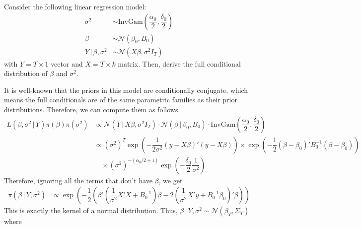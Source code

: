 \documentclass[answers]{exam}
\begin{document}
\newpage
{}
\begin{questions}
  \question
  Consider the following linear regression model:
  \begin{align}
    \sigma^{2} &\sim \mathrm{InvGam}\left(\dfrac{\alpha_{0}}{2},\dfrac{\delta_{0}}{2}\right)\\
    \beta &\sim \mathcal{N}\left(\beta_{0},B_{0}\right)\\
    Y\,|\,\beta,\sigma^{2} &\sim \mathcal{N}\left(X\beta,\sigma^{2}I_{T}\right)
  \end{align}
  with $Y=T\times 1$ vector and $X=T\times k$ matrix. Then, derive the full conditional distribution of $\beta$ and $\sigma^{2}$.
  \begin{solution}
    It is well-known that the priors in this model are conditionally conjugate, which means the full conditionals are of the same parametric families as their prior distributions. Therefore, we can compute them as follows.
    \begin{align}
      L(\beta,\sigma^{2}\,|\,Y)\pi\left(\beta\right)\pi\left(\sigma^{2}\right) &\propto \mathcal{N}\left(Y\,|\,X\beta,\sigma^{2}I_{T}\right)\cdot \mathcal{N}\left(\beta\,|\,\beta_{0},B_{0}\right)\cdot \mathrm{InvGam}\left(\dfrac{\alpha_{0}}{2},\dfrac{\delta_{0}}{2}\right)\\
      &\propto \left(\sigma^{2}\right)^{T}\exp\left(-\dfrac{1}{2\sigma^{2}}\left(y-X\beta\right)'\left(y-X\beta\right)\right)\times \exp\left(-\dfrac{1}{2}\left(\beta-\beta_{0}\right)'B_{0}^{-1}\left(\beta-\beta_{0}\right)\right)\\
      &\quad \times \left(\sigma^{2}\right)^{-\left(\alpha_{0}/2+1\right)}\exp\left(-\dfrac{\delta_{0}}{2}\dfrac{1}{\sigma^{2}}\right)
    \end{align}
    Therefore, ignoring all the terms that don't have $\beta$, we get
    \begin{align}
      \pi\left(\beta\,|\,Y,\sigma^{2}\right) &\propto \exp\left(-\dfrac{1}{2}\left(\beta'\left(\dfrac{1}{\sigma^{2}}X'X+B_{0}^{-1}\right)\beta-2\left(\dfrac{1}{\sigma^{2}}X'y+B_{0}^{-1}\beta_{0}\right)'\beta\right)\right)
    \end{align}
    This is exactly the kernel of a normal distribution. Thus, $\beta\,|\,Y,\sigma^{2}\sim\mathcal{N}\left(\beta_{T},\Sigma_{T}\right)$ where

\end{solution}
\end{questions}
\end{document}
